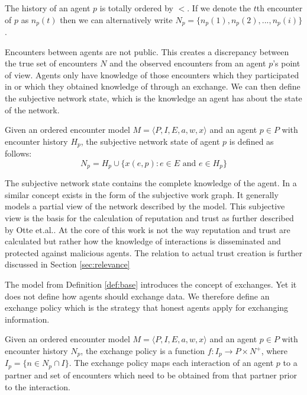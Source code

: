 The history of an agent $p$ is totally ordered by $<$. If we denote the 
$t$th encounter of $p$ as $n_p(t)$ then we can alternatively write $N_p = \{ n_p(1), n_p(2), ..., n_p(i)\}$.

Encounters between agents are not public. This creates a discrepancy between the true set of 
encounters $N$ and the observed encounters from an agent $p$'s point of view. Agents only have 
knowledge of those encounters which they participated in or which they obtained knowledge of through an exchange.
We can then define the subjective network state, which is the knowledge an agent has about the state of
the network.

\begin{defn}
    \label{def:subjective_network_state}
    Given an ordered encounter model $M = \langle P, I, E, a, w, x \rangle$ and an agent $p \in P$ with encounter history $H_p$, the subjective network state of agent $p$
    is defined as follows:
    \begin{equation}
        N_p = H_p \cup \{ x(e, p) : e \in E \text{ and } e \in H_p \}
    \end{equation}
\end{defn}

The subjective network state contains the complete knowledge of the agent. In \cite{OTTE2017} a 
similar concept exists in the form of the subjective work graph. It generally models a partial view
of the network described by the model. This subjective view is the basis for the calculation of 
reputation and trust as further described by Otte et.al.. At the core of this work is not the way 
reputation and trust are calculated but rather how the knowledge of interactions is disseminated and
protected against malicious agents. The relation to actual trust creation is further discussed in 
Section \ref{sec:relevance}

The model from Definition \ref{def:base} introduces the concept of exchanges. Yet it does not define
how agents should exchange data. We therefore define an exchange policy which is the strategy that 
honest agents apply for exchanging information.

\begin{defn}
    Given an ordered encounter model $M = \langle P, I, E, a, w, x \rangle$ and an agent $p \in P$ with encounter history $N_p$,
    the exchange policy is a function $f : I_p \rightarrow P \times N^+$, where $I_p = \{ n \in N_p  \cap I\}$.
    The exchange policy maps each interaction of an agent $p$ to a partner and set of encounters 
    which need to be obtained from that partner prior to the interaction.
\end{defn}

